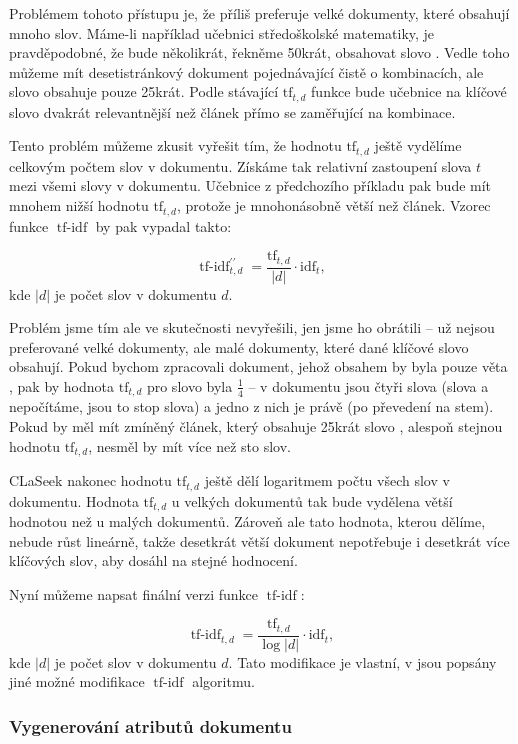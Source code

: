 \documentclass[12pt]{article}
\newcommand{\name}{CLaSeek}
\newcommand{\sssection}[1]{\subsubsection{#1}}
\DeclareMathOperator{\tfidf}{tf-idf}
\begin{document}
Problémem tohoto přístupu je, že příliš preferuje velké dokumenty, které obsahují mnoho slov. Máme-li například učebnici středoškolské matematiky, je pravděpodobné, že bude několikrát, řekněme 50krát, obsahovat slovo . Vedle toho můžeme mít desetistránkový dokument pojednávající čistě o kombinacích, ale slovo  obsahuje pouze 25krát. Podle stávající $\mbox{tf}_{t,d}$ funkce bude učebnice na klíčové slovo  dvakrát relevantnější než článek přímo se zaměřující na kombinace. 

Tento problém můžeme zkusit vyřešit tím, že hodnotu $\mbox{tf}_{t,d}$ ještě vydělíme celkovým počtem slov v dokumentu. Získáme tak relativní zastoupení slova $t$ mezi všemi slovy v dokumentu. Učebnice z předchozího příkladu pak bude mít mnohem nižší hodnotu $\mbox{tf}_{t,d}$, protože je mnohonásobně větší než článek. Vzorec funkce $\tfidf$ by pak vypadal takto:

$$
\tfidf_{t,d}^{\prime\prime} = \frac{\mbox{tf}_{t,d}}{|d|}\cdot\mbox{idf}_t,
$$
kde $|d|$ je počet slov v dokumentu $d$.

Problém jsme tím ale ve skutečnosti nevyřešili, jen jsme ho obrátili -- už nejsou preferované velké dokumenty, ale malé dokumenty, které dané klíčové slovo obsahují. Pokud bychom zpracovali dokument, jehož obsahem by byla pouze věta , pak by hodnota $\mbox{tf}_{t,d}$ pro slovo  byla $\frac14$ -- v dokumentu jsou čtyři slova (slova  a  nepočítáme, jsou to stop slova) a jedno z nich je právě  (po převedení na stem). Pokud by měl mít zmíněný článek, který obsahuje 25krát slovo , alespoň stejnou hodnotu $\mbox{tf}_{t,d}$, nesměl by mít více než sto slov. 

\name{} nakonec hodnotu $\mbox{tf}_{t,d}$ ještě dělí logaritmem počtu všech slov v dokumentu. Hodnota $\mbox{tf}_{t,d}$ u velkých dokumentů tak bude vydělena větší hodnotou než u malých dokumentů. Zároveň ale tato hodnota, kterou dělíme, nebude růst lineárně, takže desetkrát větší dokument nepotřebuje i desetkrát více klíčových slov, aby dosáhl na stejné hodnocení.

Nyní můžeme napsat finální verzi funkce $\tfidf$:

$$
\tfidf_{t,d} = \frac{\mbox{tf}_{t,d}}{\log |d|}\cdot\mbox{idf}_t,
$$
kde $|d|$ je počet slov v dokumentu $d$. Tato modifikace je vlastní, v \cite{introir} jsou popsány jiné možné modifikace $\tfidf$ algoritmu. 

\sssection{Vygenerování atributů dokumentu}
\end{document}

